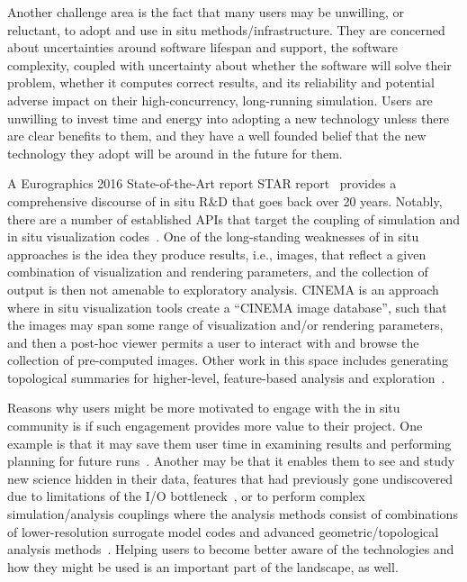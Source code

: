 \begin{refsection}
Another challenge area is the fact that many users may be unwilling, or reluctant, to adopt and use in situ methods/infrastructure. 
They are concerned about uncertainties around software lifespan and support, the software complexity, coupled with uncertainty about whether the software will solve their problem, whether it computes correct results, and its reliability and potential adverse impact on their high-concurrency, long-running simulation. 
Users are unwilling to invest time and energy into adopting a new technology unless there are clear benefits to them, and they have a well founded belief that the new technology they adopt will be around in the future for them.

A Eurographics 2016 State-of-the-Art report STAR report~\cite{Bauer16} provides a comprehensive discourse of in situ R\&D that goes back over 20 years. 
Notably, there are a number of established APIs that target the coupling of simulation and in situ visualization codes~\cite{Fabian11, Whitlock11, Ayachit16, Ayachit16a, Larsen17}.
One of the long-standing weaknesses of in situ approaches is the idea they produce results, i.e., images, that reflect a given combination of visualization and rendering parameters, and the collection of output is then not amenable to exploratory analysis.
CINEMA\cite{Ahrens14} is an approach where in situ visualization tools create a ``CINEMA image database'', such that the images may span some range of visualization and/or rendering parameters, and then a post-hoc viewer permits a user to interact with and browse the collection of pre-computed images. 
Other work in this space includes generating topological summaries for higher-level, feature-based analysis and exploration~\cite{Biedert15}. 

Reasons why users might be more motivated to engage with the in situ community is if such engagement provides more value to their project. 
One example is that it may save them user time in examining results and performing planning for future runs~\cite{Patchett18}. 
Another may be that it enables them to see and study new science hidden in their data, features that had previously gone undiscovered due to limitations of the I/O bottleneck~\cite{Rubel16}, or to perform complex simulation/analysis couplings where the analysis methods consist of combinations of lower-resolution surrogate model codes and advanced geometric/topological analysis methods~\cite{Morozov16}. 
Helping users to become better aware of the technologies and how they might be used is an important part of the landscape, as well. 


\end{refsection}
